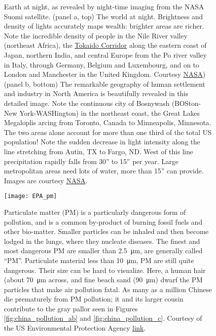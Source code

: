 \newpage
\begin{figure}[p]
\centering
{}


\caption{Earth at night, as revealed by night-time imaging from the NASA Suomi satellite. (panel a, top) The world at night. Brightness and density of lights accurately maps wealth: brighter areas are richer. Note the incredible density of people in the Nile River valley (northeast Africa), the  \href{https://people.hofstra.edu/geotrans/eng/ch6en/appl6en/tokaido.html}{Tokaido Corridor} along the eastern coast of Japan, northern India, and central Europe from the Po river valley in Italy, through Germany, Belgium and Luxembourg, and on to London and Manchester in the United Kingdom.  Courtesy \href{http://eoimages.gsfc.nasa.gov/images/imagerecords/79000/79765/dnb_land_ocean_ice.2012.3600x1800.jpg}{NASA}) (panel b, bottom) The remarkable geography of human settlement and industry in  North America is beautifully revealed in this detailed image. Note the continuous city of Bosnywash (BOSton-New York-WASHington) in the northeast coast, the Great Lakes Megaloplis arcing from Toronto, Canada to Minneapolis, Minnesota. The two areas alone account for more than one third of the total US population! Note the sudden decrease in light intensity along the line stretching from Autin, TX to Fargo, ND. West of this line  precipitation rapidly falls from 30'' to 15'' per year. Large metropolitan areas need lots of water, more than 15'' can provide. Images are courtesy \href{https://www.nasa.gov/sites/default/files/images/712129main_8247975848_88635d38a1_o.jpg}{NASA}.}

\label{fig:world_night_ab}
\end{figure}
 
\newpage
\begin{figure}[p]
\centering
\texttt{[image: EPA\_pm]}%

\caption{Particulate matter (PM) is a particularly dangerous form of pollution, and is a common by-product of burning fossil fuels and other bio-matter. Smaller particles can be inhaled and then become lodged in the lungs, where they nucleate diseases. The finest and most dangerous PM are smaller than \SI{2.5}{\micro\meter}, are generally called ``PM''. Particulate material less than \SI{10}{\micro\meter}, PM are still quite dangerous. Their size can be hard to visualize. Here, a human hair (about \SI{70}{\micro\meter} across, and fine beach sand (\SI{90}{\micro\meter}) dwarf the PM particles that make air pollution fatal. As many as a million Chinese die prematurely from PM pollution; it and its larger cousin contribute to the gray pallor seen in Figures \ref{fig:china_pollution_ab} and \ref{fig:china_pollution_c}. Courtesy of the US Environmental Protection Agency \href{https://www.epa.gov/sites/production/files/2016-09/pm2.5_scale_graphic-color_2.jpg}{link}.}

\label{fig:EPA_pm}

\end{figure}

